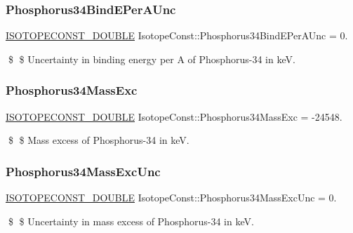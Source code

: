 \subsubsection{\texorpdfstring{Phosphorus34\+Bind\+E\+Per\+A\+Unc}{Phosphorus34BindEPerAUnc}}
{\footnotesize\ttfamily \mbox{\hyperlink{group___isotope_const-_macros_ga8f45a7272ce02c0b4c65c44636ed719a}{I\+S\+O\+T\+O\+P\+E\+C\+O\+N\+S\+T\+\_\+\+D\+O\+U\+B\+LE}} Isotope\+Const\+::\+Phosphorus34\+Bind\+E\+Per\+A\+Unc = 0.}

\$ \$ Uncertainty in binding energy per A of Phosphorus-\/34 in keV. \mbox{\label{group___isotope_const-_phosphorus-_p34_ga9f5a86a521b1780b60989f26e4db5e7d}} 
\subsubsection{\texorpdfstring{Phosphorus34\+Mass\+Exc}{Phosphorus34MassExc}}
{\footnotesize\ttfamily \mbox{\hyperlink{group___isotope_const-_macros_ga8f45a7272ce02c0b4c65c44636ed719a}{I\+S\+O\+T\+O\+P\+E\+C\+O\+N\+S\+T\+\_\+\+D\+O\+U\+B\+LE}} Isotope\+Const\+::\+Phosphorus34\+Mass\+Exc = -\/24548.}

\$ \$ Mass excess of Phosphorus-\/34 in keV. \mbox{\label{group___isotope_const-_phosphorus-_p34_gadc1826830062ed831d08d06942ffee8e}} 
\subsubsection{\texorpdfstring{Phosphorus34\+Mass\+Exc\+Unc}{Phosphorus34MassExcUnc}}
{\footnotesize\ttfamily \mbox{\hyperlink{group___isotope_const-_macros_ga8f45a7272ce02c0b4c65c44636ed719a}{I\+S\+O\+T\+O\+P\+E\+C\+O\+N\+S\+T\+\_\+\+D\+O\+U\+B\+LE}} Isotope\+Const\+::\+Phosphorus34\+Mass\+Exc\+Unc = 0.}

\$ \$ Uncertainty in mass excess of Phosphorus-\/34 in keV. \mbox{\label{group___isotope_const-_phosphorus-_p34_ga854fcf9d0d667a837bd65de90b27f280}} 
